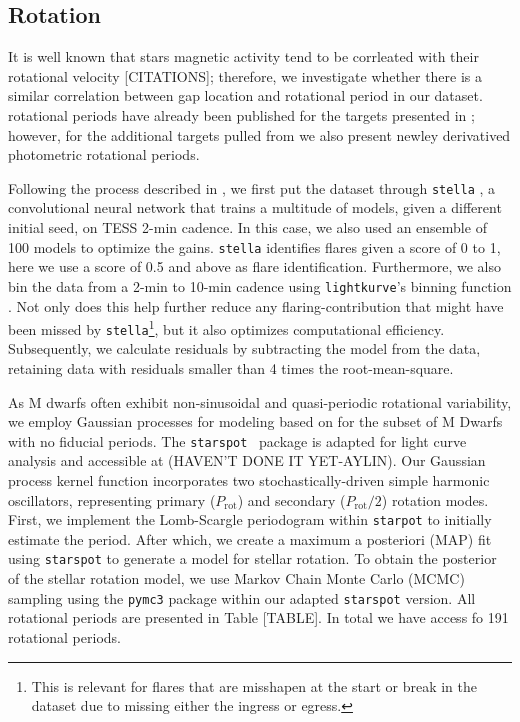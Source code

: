 \subsection{Rotation}
It is well known that stars magnetic activity tend to be corrleated with their
rotational velocity {\color{red}[CITATIONS]}; therefore, we investigate whether
there is a similar correlation between gap location and rotational period in
our dataset. rotational periods have already been published for the targets
presented in \citet{Boudreaux2022}; however, for the additional targets pulled
from \citet{Perdelwitz2021} we also present newley derivatived photometric
rotational periods.

Following the process described in \citet{023AJ....165..192G}, we first put the
dataset through \texttt{stella} \citep{FeinsteinFlare2020,FeinsteinStella2020},
a convolutional neural network that trains a multitude of models, given a
different initial seed, on TESS 2-min cadence. In this case, we also used an
ensemble of 100 models to optimize the gains. \texttt{stella} identifies flares
given a score of 0 to 1, here we use a score of 0.5 and above as flare
identification. Furthermore, we also bin the data from a 2-min to 10-min
cadence using \texttt{lightkurve}'s binning function
\citep{LightkurveCollaborationLightkurve2018,GeertBarentsenKeplerGO2020}. Not
only does this help further reduce any flaring-contribution that might have
been missed by \texttt{stella}\footnote{This is relevant for flares that are
misshapen at the start or break in the dataset due to missing either the
ingress or egress.}, but it also optimizes computational efficiency.
Subsequently, we calculate residuals by subtracting the model from the data,
retaining data with residuals smaller than 4 times the root-mean-square.

As M dwarfs often exhibit non-sinusoidal and quasi-periodic rotational
variability, we employ Gaussian processes for modeling based on
\citet{AngusInferring2018} for the subset of M Dwarfs with no fiducial periods.
The \texttt{starspot} \ package is adapted for light curve analysis
\citep{AngusRuthAngus2021,https://doi.org/10.5281/zenodo.7697238} and
accessible at (HAVEN'T DONE IT YET-AYLIN). Our Gaussian process kernel function
incorporates two stochastically-driven simple harmonic oscillators,
representing primary ($P_\textrm{rot}$) and secondary ($P_\textrm{rot}/2$)
rotation modes. First, we implement the Lomb-Scargle periodogram within
\texttt{starpot} to initially estimate the period. After which, we create a
maximum a posteriori (MAP) fit using \texttt{starspot} to generate a model for
stellar rotation. To obtain the posterior of the stellar rotation model, we use
Markov Chain Monte Carlo (MCMC) sampling using the \texttt{pymc3} package
\citep{SalvatierProbabilistic2016} within our adapted \texttt{starspot}
version. All rotational periods are presented in Table {\color{red}[TABLE]}. In
total we have access fo 191 rotational periods.

